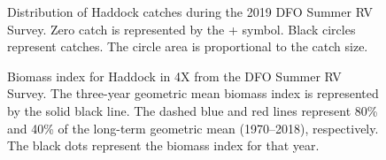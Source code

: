 \documentclass[11pt]{book}
\begin{document}
\begin{figure}[htb]

{\centering {} 

}

\caption{Distribution of Haddock catches during the 2019 DFO Summer RV Survey. Zero catch is represented by the + symbol. Black circles represent catches. The circle area is proportional to the catch size.}\label{fig:14-map-haddock}
\end{figure}

\begin{figure}[htb]

{\centering {} 

}

\caption{Biomass index for Haddock in 4X from the DFO Summer RV Survey. The three-year geometric mean biomass index is represented by the solid black line. The dashed blue and red lines represent 80\% and 40\% of the long-term geometric mean (1970--2018), respectively. The black dots represent the biomass index for that year.}\label{fig:15-fig-haddock-biomass4X}
\end{figure}
\end{document}
